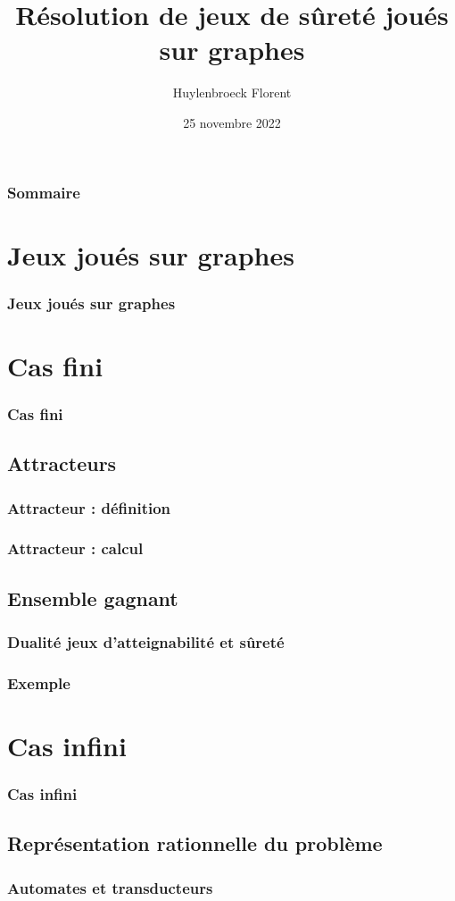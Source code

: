 \documentclass{beamer}
\title{Résolution de jeux de sûreté joués sur graphes}
\author{Huylenbroeck Florent}
\institute{UMONS}
\date{25 novembre 2022}
\begin{document}
\frame{\titlepage}

\begin{frame}
\frametitle{Sommaire}
\tableofcontents
\end{frame}

\section{Jeux joués sur graphes}
\begin{frame}
\frametitle{Jeux joués sur graphes}
\end{frame}

\section{Cas fini}
\begin{frame}
\frametitle{Cas fini} %
\end{frame}

\subsection{Attracteurs}
\begin{frame}
\frametitle{Attracteur : définition}
\end{frame}

\begin{frame}
\frametitle{Attracteur : calcul}
\end{frame}

\subsection{Ensemble gagnant}
\begin{frame}
\frametitle{Dualité jeux d'atteignabilité et sûreté}
\end{frame}

\begin{frame}
\frametitle{Exemple}
\end{frame}

\section{Cas infini}
\begin{frame}
\frametitle{Cas infini} %
\end{frame}

\subsection{Représentation rationnelle du problème}
\begin{frame}
\frametitle{Automates et transducteurs}
\end{frame}
\end{document}
